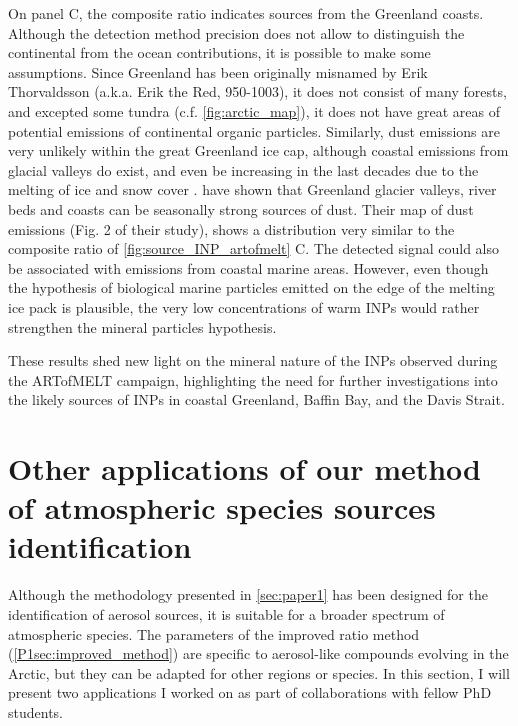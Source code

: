    On panel C, the composite ratio indicates sources from the Greenland coasts. Although the detection method precision does not allow to distinguish the continental from the ocean contributions, it is possible to make some assumptions.
    Since Greenland has been originally misnamed by Erik Thorvaldsson (a.k.a. Erik the Red, 950-1003), it does not consist of many forests, and excepted some tundra (c.f. \cref{fig:arctic_map}), it does not have great areas of potential emissions of continental organic particles.
    Similarly, dust emissions are very unlikely within the great Greenland ice cap, although coastal emissions from glacial valleys do exist, and even be increasing in the last decades due to the melting of ice and snow cover \citep{amino_increasing_2021}.
    \citet{meinander_newly_2022} have shown that Greenland glacier valleys, river beds and coasts can be seasonally strong sources of dust. Their map of dust emissions (Fig. 2 of their study), shows a distribution very similar to the composite ratio of \cref{fig:source_INP_artofmelt} C.
    The detected signal could also be associated with emissions from coastal marine areas. However, even though the hypothesis of biological marine particles emitted on the edge of the melting ice pack is plausible, the very low concentrations of warm INPs would rather strengthen the mineral particles hypothesis.
    \vspace{\baselineskip}

    These results shed new light on the mineral nature of the INPs observed during the ARTofMELT campaign, highlighting the need for further investigations into the likely sources of INPs in coastal Greenland, Baffin Bay, and the Davis Strait.



\section{Other applications of our method of atmospheric species sources identification}
\label{sec:other_applications}
    Although the methodology presented in \cref{sec:paper1} has been designed for the identification of aerosol sources, it is suitable for a broader spectrum of atmospheric species.
    The parameters of the improved ratio method (\cref{P1sec:improved_method}) are specific to aerosol-like compounds evolving in the Arctic, but they can be adapted for other regions or species.
    In this section, I will present two applications I worked on as part of collaborations with fellow PhD students. 

